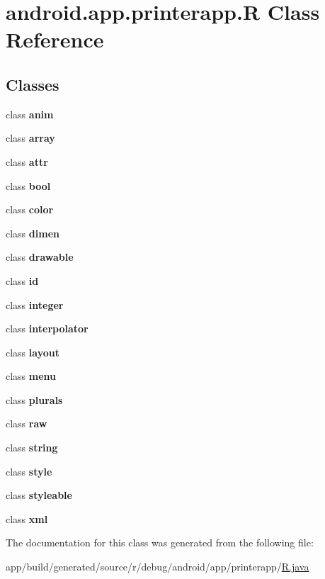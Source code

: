 \hypertarget{classandroid_1_1app_1_1printerapp_1_1_r}{}\section{android.\+app.\+printerapp.\+R Class Reference}
\label{classandroid_1_1app_1_1printerapp_1_1_r}
\subsection*{Classes}
\begin{DoxyCompactItemize}
\item 
class {\bfseries anim}
\item 
class {\bfseries array}
\item 
class {\bfseries attr}
\item 
class {\bfseries bool}
\item 
class {\bfseries color}
\item 
class {\bfseries dimen}
\item 
class {\bfseries drawable}
\item 
class {\bfseries id}
\item 
class {\bfseries integer}
\item 
class {\bfseries interpolator}
\item 
class {\bfseries layout}
\item 
class {\bfseries menu}
\item 
class {\bfseries plurals}
\item 
class {\bfseries raw}
\item 
class {\bfseries string}
\item 
class {\bfseries style}
\item 
class {\bfseries styleable}
\item 
class {\bfseries xml}
\end{DoxyCompactItemize}


The documentation for this class was generated from the following file\+:\begin{DoxyCompactItemize}
\item 
app/build/generated/source/r/debug/android/app/printerapp/\hyperlink{app_2build_2generated_2source_2r_2debug_2android_2app_2printerapp_2_r_8java}{R.\+java}\end{DoxyCompactItemize}
